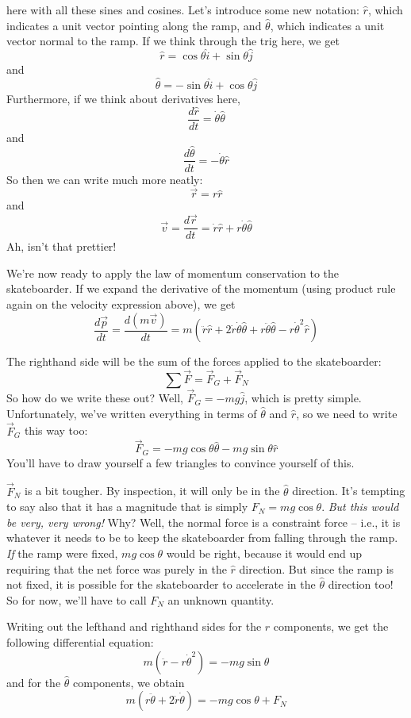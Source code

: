 \documentclass{tufte-handout}
\begin{document}
 here with all these sines and cosines.  Let's introduce some new notation: $\hat{r}$, which indicates a unit vector pointing along the ramp, and $\hat{\theta}$, which indicates a unit vector normal to the ramp.  If we think through the trig here, we get
$$\hat{r} = \cos \theta \hat{i} + \sin \theta \hat{j}$$
and
$$\hat{\theta} = -\sin \theta \hat{i} + \cos \theta \hat{j}$$
Furthermore, if we think about derivatives here,
$$\frac{d\hat{r}}{dt} = \dot{\theta} \hat{\theta}$$
and 
$$\frac{d\hat{\theta}}{dt} = -\dot{\theta} \hat{r}$$
So then we can write much more neatly:
$$\vec{r} = r \hat{r}$$
and 
$$\vec{v} = \frac{d\vec{r}}{dt} = \dot{r} \hat{r} + r \dot{\theta} \hat{\theta}$$
Ah, isn't that prettier!

We're now ready to apply the law of momentum conservation to the skateboarder.  If we expand the derivative of the momentum (using product rule again on the velocity expression above), we get
$$\frac{d\vec{p}}{dt}  = \frac{d(m\vec{v})}{dt} = m(\ddot{r} \hat{r} + 2\dot{r}\dot{\theta}\hat{\theta} + r\ddot{\theta}\hat{\theta} - r\dot{\theta}^2\hat{r})$$

The righthand side will be the sum of the forces applied to the skateboarder:
$$\sum \vec{F}  = \vec{F}_G + \vec{F}_N$$
So how do we write these out?
Well, $\vec{F}_G = -mg\hat{j}$, which is pretty simple.  Unfortunately, we've written everything in terms of $\hat{\theta}$ and $\hat{r}$, so we need to write $\vec{F}_G$ this way too:
$$\vec{F}_G = -mg\cos \theta \hat{\theta} - mg \sin \theta \hat{r}$$
You'll have to draw yourself a few triangles to convince yourself of this.

$ \vec{F}_N$ is a bit tougher.  By inspection, it will only be in the $\hat{\theta}$ direction.  It's tempting to say also that it has a magnitude that is simply $F_N = mg\cos \theta$.  {\em But this would be very, very wrong!}  Why?  Well, the normal force is a constraint force -- i.e., it is whatever it needs to be to keep the skateboarder from falling through the ramp.  {\em If} the ramp were fixed, $mg\cos \theta$ would be right, because it would end up requiring that the net force was purely in the $\hat{r}$ direction.  But since the ramp is not fixed, it is possible for the skateboarder to accelerate in the $\hat{\theta}$ direction too!  So for now, we'll have to call $F_N$ an unknown quantity.  

Writing out the lefthand and righthand sides for the $\hat{r}$ components, we get the following differential equation:
$$m(\ddot{r} - r \dot{\theta}^2)  = -mg\sin \theta$$
and for the $\hat{\theta}$ components, we obtain
$$m(r\ddot{\theta}  + 2\dot{r}\dot{\theta}) = -mg \cos \theta + F_N$$
\end{document}
